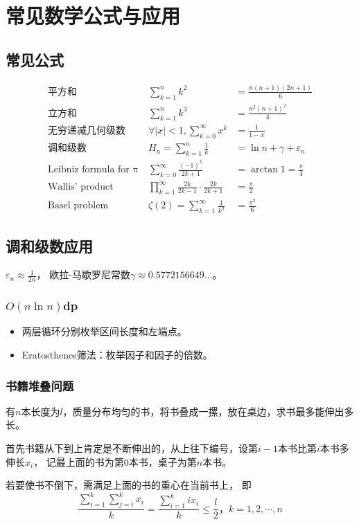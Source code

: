 \section{常见数学公式与应用}
\subsection{常见公式}
\begin{eqnarray*}
	\textrm{平方和}&~\sum_{k=1}^n{k^2}&=\frac{n(n+1)(2n+1)}{6}\\
	\textrm{立方和}&~\sum_{k=1}^n{k^3}&=\frac{n^2(n+1)^2}{4}\\
	\textrm{无穷递减几何级数}&~\forall |x|<1,\sum_{k=0}^\infty{x^k}
	&=\frac{1}{1-x}\\
	\textrm{调和级数}&~H_n=\sum_{k=1}^n{\frac{1}{k}}&=\ln n+\gamma+\varepsilon_n\\
	\textrm{Leibniz formula for π}&~\sum_{k=0}^\infty{\frac{(-1)^k}{2k+1}}
	&=\arctan 1=\frac{\pi}{4}\\
	\textrm{Wallis' product}&~\prod_{k=1}^\infty{\frac{2k}{2k-1}
		\cdot\frac{2k}{2k+1}}&=\frac{\pi}{2}\\
	\textrm{Basel problem}&~\zeta(2)=\sum_{k=1}^\infty{\frac{1}{k^2}}
	&=\frac{\pi^2}{6}
\end{eqnarray*}
\subsection{调和级数应用}
$\varepsilon_n\approx\frac{1}{2n}$，
欧拉-马歇罗尼常数$\gamma\approx 0.5772156649\ldots$。
\subsubsection{$O(n\ln n)$dp}
\begin{itemize}
	\item 两层循环分别枚举区间长度和左端点。
	\item Eratosthenes筛法：枚举因子和因子的倍数。
\end{itemize}
\subsubsection{书籍堆叠问题}
有$n$本长度为$l$，质量分布均匀的书，将书叠成一摞，放在桌边，求书最多能伸出多长。

首先书籍从下到上肯定是不断伸出的，从上往下编号，设第$i-1$本书比第$i$本书多伸长$x_i$，
记最上面的书为第$0$本书，桌子为第$n$本书。

若要使书不倒下，需满足上面的书的重心在当前书上，
即
\begin{displaymath}
	\frac{\sum_{i=1}^k{\sum_{j=i}^k{x_i}}}{k}=\frac{\sum_{i=1}^k{ix_i}}{k}\leq \frac{l}{2}，k=1,2,\cdots,n
\end{displaymath}


